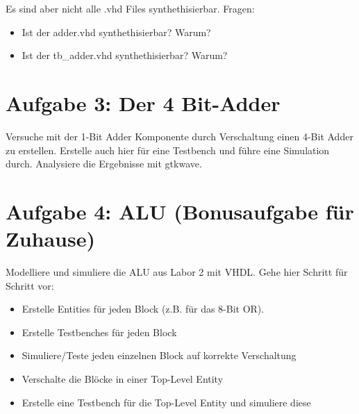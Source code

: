 \documentclass[a4paper]{scrartcl}
\begin{document}
Es sind aber nicht alle .vhd Files synthethisierbar.
Fragen:
\begin{itemize}
  \item Ist der adder.vhd synthethisierbar? Warum?
  \item Ist der tb\_adder.vhd synthethisierbar? Warum?
\end{itemize}


\section*{Aufgabe 3: Der 4 Bit-Adder}
Versuche mit der 1-Bit Adder Komponente durch Verschaltung einen 4-Bit Adder zu erstellen. Erstelle auch hier für eine Testbench und führe eine Simulation durch.
Analysiere die Ergebnisse mit  gtkwave.

\section*{Aufgabe 4: ALU (Bonusaufgabe für Zuhause)}
Modelliere und simuliere die ALU aus Labor 2 mit VHDL. Gehe hier Schritt für Schritt vor:\\
\begin{itemize}
  \item Erstelle Entities für jeden Block (z.B. für das 8-Bit OR).
  \item Erstelle Testbenches für jeden Block
  \item Simuliere/Teste jeden einzelnen Block auf korrekte Verschaltung
  \item Verschalte die Blöcke in einer Top-Level Entity
  \item Erstelle eine Testbench für die Top-Level Entity und simuliere diese
\end{itemize}
\end{document}
